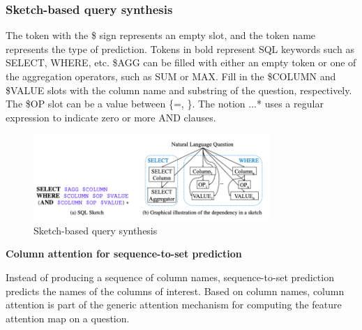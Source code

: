\subsubsection*{ Sketch-based query synthesis}

The token with the \$ sign represents an empty slot, and the token name represents the type of prediction. Tokens in bold represent SQL keywords such as SELECT, WHERE, etc.
\$AGG can be filled with either an empty token or one of the aggregation operators, such as SUM or MAX. Fill in the \$COLUMN and \$VALUE slots with the column name and substring of the question, respectively. The \$OP slot can be a value between \{=, \}. The notion \(...\)* uses a regular expression to indicate zero or more AND clauses.

\begin{figure}[htb]
    \centering
    \includegraphics[width=0.8\textwidth]{pics/sqlnet/sketch-based.png}
    \caption{Sketch-based query synthesis}
    \label{fig:sketch-based}
\end{figure}

\textbf{Column attention for sequence-to-set prediction}

Instead of producing a sequence of column names, sequence-to-set prediction predicts the names of the columns of interest.
Based on column names, column attention is part of the generic attention mechanism for computing the feature attention map on a question.

